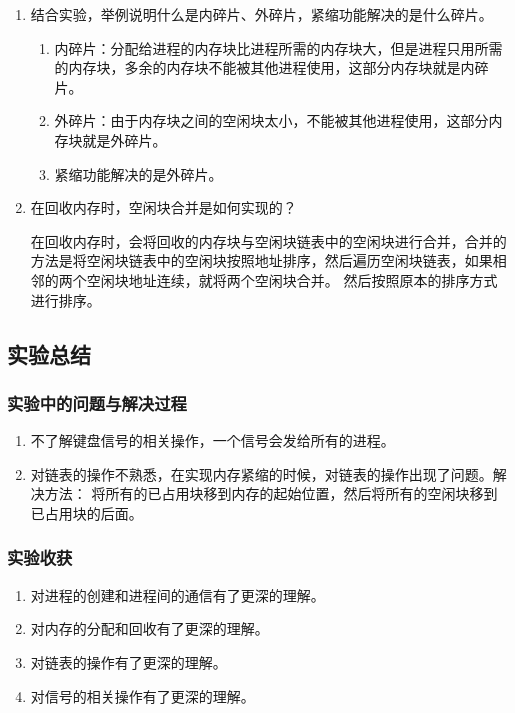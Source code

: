 \documentclass{article}
\begin{document}
\begin{enumerate}
        \item 结合实验，举例说明什么是内碎片、外碎片，紧缩功能解决的是什么碎片。
        
        \begin{enumerate}
            \item 内碎片：分配给进程的内存块比进程所需的内存块大，但是进程只用所需的内存块，多余的内存块不能被其他进程使用，这部分内存块就是内碎片。
            \item 外碎片：由于内存块之间的空闲块太小，不能被其他进程使用，这部分内存块就是外碎片。
            \item 紧缩功能解决的是外碎片。
        \end{enumerate}

        \item 在回收内存时，空闲块合并是如何实现的？
        
        在回收内存时，会将回收的内存块与空闲块链表中的空闲块进行合并，合并的方法是将空闲块链表中的空闲块按照地址排序，然后遍历空闲块链表，如果相邻的两个空闲块地址连续，就将两个空闲块合并。
        然后按照原本的排序方式进行排序。

    \end{enumerate}

    \subsection{实验总结}
    \subsubsection{实验中的问题与解决过程}

    \begin{enumerate}
        \item 不了解键盘信号的相关操作，一个信号会发给所有的进程。
        \item 对链表的操作不熟悉，在实现内存紧缩的时候，对链表的操作出现了问题。解决方法：
        将所有的已占用块移到内存的起始位置，然后将所有的空闲块移到已占用块的后面。
    \end{enumerate}

    \subsubsection{实验收获}

    \begin{enumerate}
        \item 对进程的创建和进程间的通信有了更深的理解。
        \item 对内存的分配和回收有了更深的理解。
        \item 对链表的操作有了更深的理解。
        \item 对信号的相关操作有了更深的理解。
    \end{enumerate}
\end{document}
